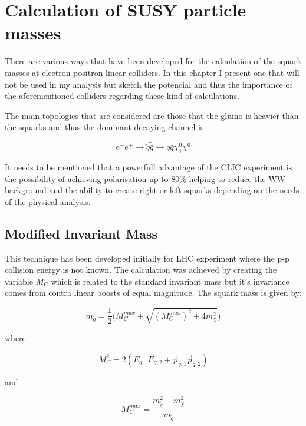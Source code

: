 \documentclass[12pt,a4paper]{report}
\begin{document}
\newpage

\section{Calculation of SUSY particle masses}

There are various ways that have been developed for the calculation of the squark masses at electron-positron
linear colliders. In this chapter I present one that will not be used in my analysis but sketch the potencial
and thus the importance of the aforementioned colliders regarding these kind of calculations.

The main topologies that are considered are those that the gluino is heavier than the squarks and thus the 
dominant decaying channel is:

\begin{equation}
 e^{-}e^{+} \rightarrow \tilde{q} \tilde{\bar{q}} \rightarrow q\bar{q}\chi_{1}^{0}\chi_{1}^{0}
\end{equation}

It needs to be mentioned that a powerfull advantage of the CLIC experiment is the possibility of achieving 
polarisation up to 80$\%$ helping to reduce the WW background and the ability to create right or left squarks
depending on the needs of the physical analysis.

\subsection{Modified Invariant Mass}

This technique has been developed initially for LHC experiment where the p-p collision energy is not known.
The calculation was achieved by creating the variable $M_{C}$ which is related to the standard 
invariant mass but it's invariance comes from contra linear boosts of equal magnitude. The squark mass is given
by:

\begin{equation}
 m_{\tilde{q}}=\frac{1}{2} \big(M_{C}^{max} + \sqrt{(M_{C}^{max})^{2} + 4m_{\chi}^{2}} \big)
\end{equation}

where 

\begin{equation}
 M_{C}^{2}=2(E_{q,1}E_{q,2}+\vec{p}_{q,1}\vec{p}_{q,2})
\end{equation}

and

\begin{equation}
 M_{C}^{max}=\frac{m^{2}_{\tilde{q}}-m^{2}_{\chi}}{m_{\tilde{q}}}
\end{equation}
\end{document}
